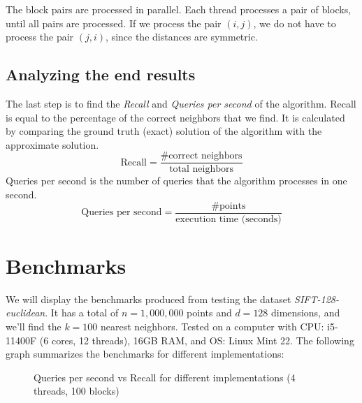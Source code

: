 \documentclass{article}
\begin{document}
The block pairs are processed in parallel. Each thread processes a pair of blocks, until all pairs are processed.
If we process the pair $(i, j)$, we do not have to process the pair $(j, i)$, since the distances are symmetric.

\subsection{Analyzing the end results}
The last step is to find the \emph{Recall} and \emph{Queries per second} of the algorithm. Recall is equal to the percentage of the
correct neighbors that we find. It is calculated by comparing the ground truth (exact) solution of the algorithm with the 
approximate solution.
\[
\text{Recall} = \frac{\text{\# correct neighbors}}{\text{total neighbors}}
\]
Queries per second is the number of queries that the algorithm processes in one second. 
\[
\text{Queries per second} = \frac{\text{\# points}}{\text{execution time (seconds)}}
\]


\section{Benchmarks}
We will display the benchmarks produced from testing the dataset \emph{SIFT-128-euclidean}.
It has a total of $n=1,000,000$ points and $d=128$ dimensions, and we'll find the $k=100$ nearest neighbors.
Tested on a computer with CPU: i5-11400F (6 cores, 12 threads), 16GB RAM, and OS: Linux Mint 22.
The following graph summarizes the benchmarks for different implementations:

\begin{figure}[H]
\centering
{}
\caption{Queries per second vs Recall for different implementations (4 threads, 100 blocks)}
\end{figure}
\end{document}
